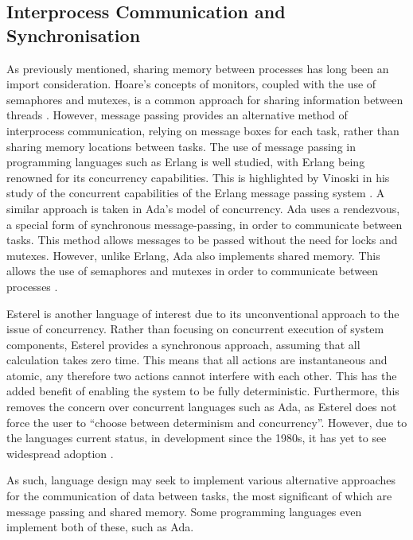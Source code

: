 \subsection{Interprocess Communication and Synchronisation} %
As previously mentioned, sharing memory between processes has long been an import
consideration. Hoare's concepts of monitors, coupled with the use of semaphores
and mutexes, is a common approach for sharing information between threads
\cite{Hoare:1974:MOS:355620.361161}.  However, message passing provides an
alternative method of interprocess communication, relying on message boxes for
each task, rather than sharing memory locations between tasks.  The use of
message passing in programming languages such as Erlang is well studied, with
Erlang being renowned for its concurrency capabilities. This is highlighted by
Vinoski in his study of the concurrent capabilities of the Erlang message
passing system \cite{6216341}. A similar approach is taken in Ada's model of
concurrency. Ada uses a rendezvous, a special form of synchronous
message-passing, in order to communicate between tasks. This method allows
messages to be passed without the need for locks and mutexes. However, unlike
Erlang, Ada also implements shared memory. This allows the use of semaphores
and mutexes in order to communicate between processes
\cite{burns1998concurrency}.  
\par\bigskip\noindent
Esterel is another language of interest due to its unconventional approach to the issue of 
concurrency. Rather than focusing on concurrent execution of system components, 
Esterel provides a synchronous approach, assuming that all calculation 
takes zero time. This means that all actions are instantaneous and atomic, 
any therefore two actions cannot interfere with each other. 
This has the added benefit of enabling the system to be fully deterministic. 
Furthermore, this removes the concern over concurrent languages such as Ada, 
as Esterel does not force the user to ``choose between determinism and concurrency''.
However, due to the languages current status, in development since the 1980s, 
it has yet to see widespread adoption
\cite{esterel}.
\par\bigskip\noindent
As such, language design
may seek to implement various alternative approaches for the communication of data
between tasks, the most significant of which are message passing and shared memory. 
Some programming languages even implement both of these, such as Ada.

